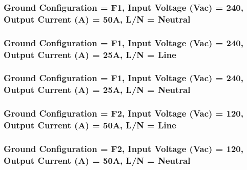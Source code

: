 \begin{center}

\end{center}



\subsubsection{Ground Configuration = F1, Input Voltage (Vac) = 240, Output Current (A) = 50A, L/N = Neutral}

\begin{center}

\end{center}



\subsubsection{Ground Configuration = F1, Input Voltage (Vac) = 240, Output Current (A) = 25A, L/N = Line}

\begin{center}

\end{center}



\subsubsection{Ground Configuration = F1, Input Voltage (Vac) = 240, Output Current (A) = 25A, L/N = Neutral}

\begin{center}

\end{center}



\subsubsection{Ground Configuration = F2, Input Voltage (Vac) = 120, Output Current (A) = 50A, L/N = Line}

\begin{center}

\end{center}



\subsubsection{Ground Configuration = F2, Input Voltage (Vac) = 120, Output Current (A) = 50A, L/N = Neutral}

